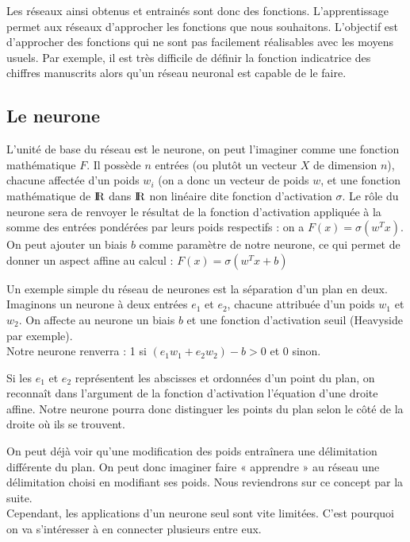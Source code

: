 Les réseaux ainsi obtenus et entrainés sont donc des fonctions. L'apprentissage permet aux réseaux d'approcher les fonctions que nous souhaitons. L'objectif est d'approcher des fonctions qui ne sont pas facilement réalisables avec les moyens usuels. Par exemple, il est très difficile de définir la fonction indicatrice des chiffres manuscrits alors qu'un réseau neuronal est capable de le faire.

\subsection{Le neurone} %
\label{sub:le_neurone}
L’unité de base du réseau est le neurone, on peut l’imaginer comme une fonction mathématique $F$. Il possède $n$ entrées (ou plutôt un vecteur $X$ de dimension $n$), chacune affectée d’un poids $w_i$ (on a donc un vecteur de poids $w$, et une fonction mathématique de $\textrm{I\kern-0.21emR}$ dans $\textrm{I\kern-0.21emR}$ non linéaire dite fonction d'activation $\sigma$. Le rôle du neurone sera de renvoyer le résultat de la fonction d'activation appliquée à la somme des entrées pondérées par leurs poids respectifs : on a $F(x) = \sigma(w^T x)$. On peut ajouter un biais $b$ comme paramètre de notre neurone, ce qui permet de donner un aspect affine au calcul : $F(x) = \sigma(w^T x + b)$

Un exemple simple du réseau de neurones est la séparation d’un plan en deux.\\
Imaginons un neurone à deux entrées $e_1$ et $e_2$, chacune attribuée d’un poids $w_1$ et $w_2$. On affecte au neurone un biais $b$ et une fonction d’activation seuil (Heavyside par exemple).\\
Notre neurone renverra : 1 si $(e_1w_1+e_2w_2) - b >0$ et 0 sinon.

Si les $e_1$ et $e_2$ représentent les abscisses et ordonnées d’un point du plan, on reconnaît dans l’argument de la fonction d’activation l’équation d’une droite affine. Notre neurone pourra donc distinguer les points du plan selon le côté de la droite où ils se trouvent.

On peut déjà voir qu’une modification des poids entraînera une délimitation différente du plan. On peut donc imaginer faire « apprendre » au réseau une délimitation choisi en modifiant ses poids. Nous reviendrons sur ce concept par la suite.\\
Cependant, les applications d’un neurone seul sont vite limitées. C’est pourquoi on va s’intéresser à en connecter plusieurs entre eux.

